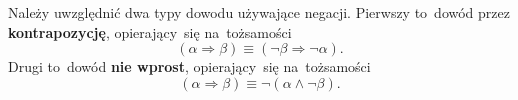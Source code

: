 \documentclass[a4paper,11pt]{article}
\begin{document}

\start {} Należy uwzględnić dwa typy dowodu używające negacji.
Pierwszy to~dowód przez \textbf{kontrapozycję}, opierający~się
na~tożsamości
\begin{equation}
  \label{eq:Kuratowski-01}
  ( \alpha \Rightarrow \beta ) \equiv ( \neg \beta \Rightarrow \neg \alpha).
\end{equation}
Drugi to~dowód \textbf{nie wprost}, opierający~się na~tożsamości
\begin{equation}
  \label{eq:Kuratowski-02}
  ( \alpha \Rightarrow \beta ) \equiv \neg ( \alpha \land \neg \beta ).
\end{equation}

\vspace{\spaceFour}





\end{document}
